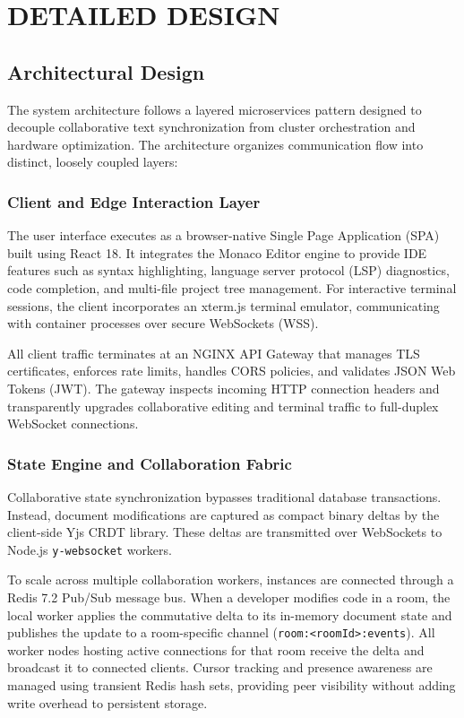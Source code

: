 \documentclass[12pt,a4paper]{report}
\begin{document}
\chapter{DETAILED DESIGN}

\section{Architectural Design}
The system architecture follows a layered microservices pattern designed to decouple collaborative text synchronization from cluster orchestration and hardware optimization. The architecture organizes communication flow into distinct, loosely coupled layers:

\subsection{Client and Edge Interaction Layer}
The user interface executes as a browser-native Single Page Application (SPA) built using React 18. It integrates the Monaco Editor engine to provide IDE features such as syntax highlighting, language server protocol (LSP) diagnostics, code completion, and multi-file project tree management. For interactive terminal sessions, the client incorporates an xterm.js terminal emulator, communicating with container processes over secure WebSockets (WSS).

All client traffic terminates at an NGINX API Gateway that manages TLS certificates, enforces rate limits, handles CORS policies, and validates JSON Web Tokens (JWT). The gateway inspects incoming HTTP connection headers and transparently upgrades collaborative editing and terminal traffic to full-duplex WebSocket connections.

\subsection{State Engine and Collaboration Fabric}
Collaborative state synchronization bypasses traditional database transactions. Instead, document modifications are captured as compact binary deltas by the client-side Yjs CRDT library. These deltas are transmitted over WebSockets to Node.js \texttt{y-websocket} workers.

To scale across multiple collaboration workers, instances are connected through a Redis 7.2 Pub/Sub message bus. When a developer modifies code in a room, the local worker applies the commutative delta to its in-memory document state and publishes the update to a room-specific channel (\texttt{room:<roomId>:events}). All worker nodes hosting active connections for that room receive the delta and broadcast it to connected clients. Cursor tracking and presence awareness are managed using transient Redis hash sets, providing peer visibility without adding write overhead to persistent storage.
\end{document}
